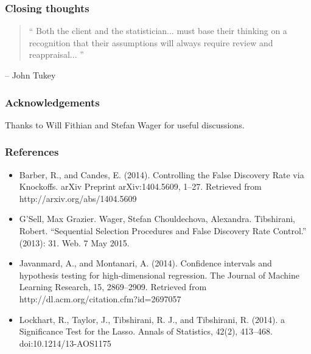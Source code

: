 \documentclass{beamer}
\begin{document}
\begin{frame}
\frametitle{Closing thoughts}
\begin{quotation}
`` Both the client and the statistician... must base their thinking on
  a recognition that their assumptions will always require review and
  reappraisal...  ''
\end{quotation}
\hfill -- John Tukey
\end{frame}

\begin{frame}
\frametitle{Acknowledgements}
Thanks to Will Fithian and Stefan Wager for useful discussions.
\end{frame}

\begin{frame}
\frametitle{References}
\begin{itemize}
\item Barber, R., and Candes, E. (2014). Controlling the False Discovery Rate via Knockoffs. arXiv Preprint arXiv:1404.5609, 1–27. Retrieved from http://arxiv.org/abs/1404.5609
\item G’Sell, Max Grazier. Wager, Stefan
Chouldechova, Alexandra.
Tibshirani, Robert. “Sequential Selection Procedures and False Discovery Rate Control.” (2013): 31. Web. 7 May 2015.
\item Javanmard, A., and Montanari, A. (2014). Confidence intervals and hypothesis testing for high-dimensional regression. The Journal of Machine Learning Research, 15, 2869–2909. Retrieved from http://dl.acm.org/citation.cfm?id=2697057
\item Lockhart, R., Taylor, J., Tibshirani, R. J., and Tibshirani, R. (2014). a Significance Test for the Lasso. Annals of Statistics, 42(2), 413–468. doi:10.1214/13-AOS1175
\end{itemize}
\end{frame}
\end{document}
